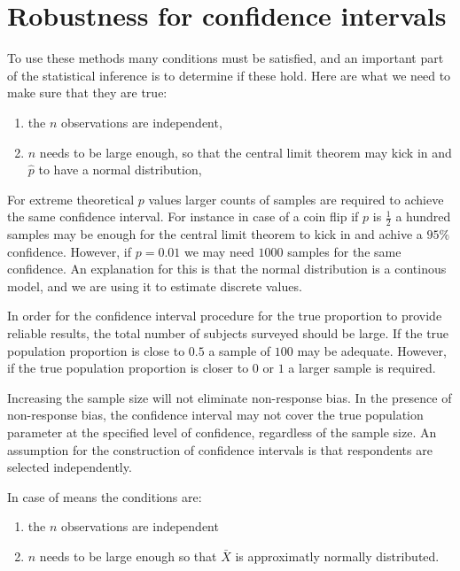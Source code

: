 \section{Robustness for confidence intervals}

To use these methods many conditions must be satisfied, and an important part of
the statistical inference is to determine if these hold. Here are what we need
to make sure that they are true:

\begin{enumerate}
  \item the $n$ observations are independent,
  \item $n$ needs to be large enough, so that the central limit theorem may kick
  in and $\hat{p}$ to have a normal distribution,
\end{enumerate}

For extreme theoretical $p$ values larger counts of samples are required to
achieve the same confidence interval. For instance in case of a coin flip if $p$
is $\frac{1}{2}$ a hundred samples may be enough for the central limit theorem
to kick in and achive a $95\%$ confidence. However, if $p=0.01$ we may need
$1000$ samples for the same confidence. An explanation for this is that the
normal distribution is a continous model, and we are using it to estimate
discrete values.

In order for the confidence interval procedure for the true proportion to
provide reliable results, the total number of subjects surveyed should be large.
If the true population proportion is close to $0.5$ a sample of $100$ may be
adequate. However, if the true population proportion is closer to $0$ or $1$ a
larger sample is required.

Increasing the sample size will not eliminate non-response bias. In the presence
of non-response bias, the confidence interval may not cover the true population
parameter at the specified level of confidence, regardless of the sample size.
An assumption for the construction of confidence intervals is that respondents
are selected independently.

In case of means the conditions are:

\begin{enumerate}
  \item the $n$ observations are independent
  \item $n$ needs to be large enough so that $\bar{X}$ is approximatly normally
  distributed.
\end{enumerate}

